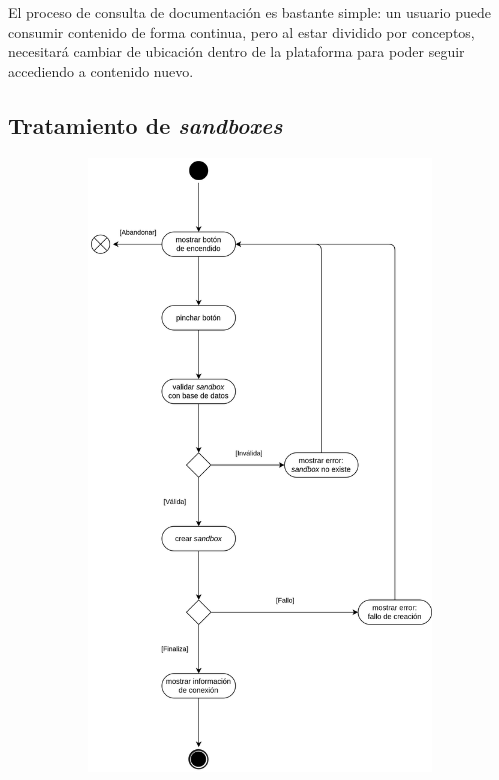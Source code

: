             El proceso de consulta de documentación es bastante simple: un usuario puede consumir contenido de forma continua, pero al estar dividido por conceptos, necesitará cambiar de ubicación dentro de la plataforma para poder seguir accediendo a contenido nuevo.
            
            \newpage
            
            
        \subsection{Tratamiento de \textit{sandboxes}}
        
            \begin{figure}[h]
                \centering
                
                \begin{subfigure}{0.45\textwidth}
                    \centering
                    
                    \includegraphics[scale=0.115]{images/Diagramas/Actividades y transiciones 4.png}
                    

\end{subfigure}
\end{figure}
